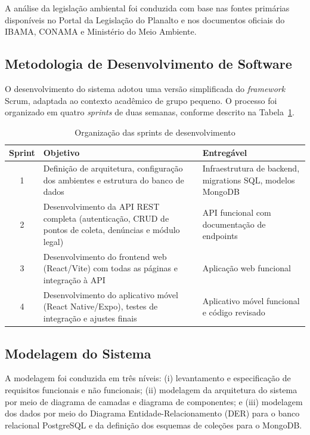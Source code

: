 \documentclass[12pt, a4paper]{article}
\numberwithin{equation}{section}
\numberwithin{figure}{section}
\numberwithin{table}{section}
\begin{document}
A análise da legislação ambiental foi conduzida com base nas fontes primárias
disponíveis no Portal da Legislação do Planalto e nos documentos oficiais do
IBAMA, CONAMA e Ministério do Meio Ambiente.

\subsection{Metodologia de Desenvolvimento de Software}

O desenvolvimento do sistema adotou uma versão simplificada do \textit{framework}
Scrum, adaptada ao contexto acadêmico de grupo pequeno. O processo foi organizado
em quatro \textit{sprints} de duas semanas, conforme descrito na
Tabela~\ref{tab:sprints}.

\begin{table}[H]
  \centering
  \caption{Organização das sprints de desenvolvimento}
  \label{tab:sprints}
  \begin{tabularx}{\textwidth}{|c|X|X|}
    \hline
    \textbf{Sprint} & \textbf{Objetivo} & \textbf{Entregável} \\
    \hline
    1 & Definição de arquitetura, configuração dos ambientes e estrutura
        do banco de dados & Infraestrutura de backend, migrations SQL,
        modelos MongoDB \\
    \hline
    2 & Desenvolvimento da API REST completa (autenticação, CRUD de pontos
        de coleta, denúncias e módulo legal) & API funcional com
        documentação de endpoints \\
    \hline
    3 & Desenvolvimento do frontend web (React/Vite) com todas as páginas
        e integração à API & Aplicação web funcional \\
    \hline
    4 & Desenvolvimento do aplicativo móvel (React Native/Expo),
        testes de integração e ajustes finais & Aplicativo móvel
        funcional e código revisado \\
    \hline
  \end{tabularx}
\end{table}

\subsection{Modelagem do Sistema}

A modelagem foi conduzida em três níveis: (i) levantamento e especificação de
requisitos funcionais e não funcionais; (ii) modelagem da arquitetura do sistema
por meio de diagrama de camadas e diagrama de componentes; e (iii) modelagem
dos dados por meio do Diagrama Entidade-Relacionamento (DER) para o banco
relacional PostgreSQL e da definição dos esquemas de coleções para o MongoDB.
\end{document}
